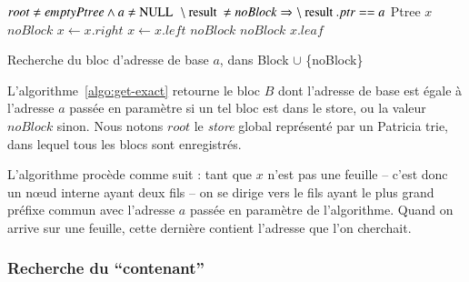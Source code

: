\begin{algorithm}
\begin{algorithmic}[1]
\Require $root \neq emptyPtree \land a \neq \mnull$
\Ensure $\mresult \neq noBlock \Rightarrow \mresult.ptr == a$
\Statex
{}
\State Ptree $x$
    \Return $noBlock$
  \EndIf
    \State $x \gets \mathit{x.right}$
    \State $x \gets \mathit{x.left}$
  \Else{} \Return $noBlock$
  \EndIf
\EndWhile
{}
  \Return $noBlock$
\Else{}
  \Return $\mathit{x.leaf}$
\EndIf
\EndFunction
\end{algorithmic}
\caption{Recherche du bloc d'adresse de base $a$, dans Block $\cup$ \{noBlock\}
  \label{algo:get-exact}}
\end{algorithm}


L'algorithme~\ref{algo:get-exact} retourne le bloc $B$ dont l'adresse de base
est égale à l'adresse $a$ passée en paramètre si un tel bloc est dans le store,
ou la valeur $noBlock$ sinon.
Nous notons $root$ le {\em store} global représenté par un Patricia trie, dans
lequel tous les blocs sont enregistrés.

L'algorithme procède comme suit : tant que $x$ n'est pas une feuille -- c'est
donc un n\oe{}ud interne ayant deux fils -- on se dirige vers le fils ayant le
plus grand préfixe commun avec l'adresse $a$ passée en paramètre de
l'algorithme.
Quand on arrive sur une feuille, cette dernière contient l'adresse que l'on
cherchait.


\subsubsection*{Recherche du ``contenant''}


